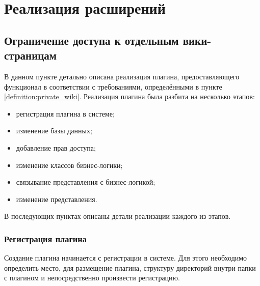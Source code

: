 \lstset{language=Ruby}

\chapter{Реализация расширений}
\label{section:implementation}

\section{Ограничение доступа к отдельным вики-страницам}
\label{section:private_wiki}
В данном пункте детально описана реализация плагина, предоставляющего
функционал в соответствии с требованиями, определёнными в пункте
\ref{definition:private_wiki}. Реализация плагина была разбита на несколько
этапов:
\begin{itemize}
  \item регистрация плагина в системе;
  \item изменение базы данных;
  \item добавление прав доступа;
  \item изменение классов бизнес-логики;
  \item связывание представления с бизнес-логикой;
  \item изменение представления.
\end{itemize}
В последующих пунктах описаны детали реализации каждого из этапов.

\subsection{Регистрация плагина}
Создание плагина начинается с регистрации в системе. Для этого необходимо
определить место, для размещение плагина, структуру директорий
внутри папки с плагином и непосредственно произвести регистрацию.

